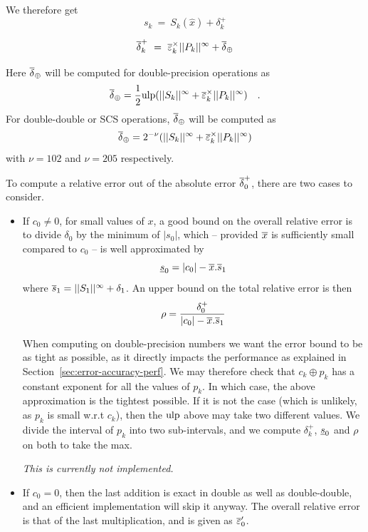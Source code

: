 \begin{itemize}
\begin{itemize}
    We therefore get 
      \begin{equation}
        s_{k} \ = \  S_{k}(\hat{x}) + \delta^+_k \label{eq:sk}
      \end{equation}
      
      \begin{equation}
        {\overline{\delta}}^+_k  \ = \  {\overline{\varepsilon}}^\times_k||{P_{k}}||^{\infty} + {\overline{\delta}}_\oplus\label{eq:maxdelta}
      \end{equation}
      
      Here ${\overline{\delta}}_\oplus$ will be computed for double-precision operations as 
      $${\overline{\delta}}_\oplus = \frac{1}{2}\mbox{ulp}(||{S_{k}}||^{\infty} + {\overline{\varepsilon}}^\times_k||{P_{k}}||^{\infty})\quad .$$
      For double-double or SCS operations, ${\overline{\delta}}_\oplus$ will be computed as
      $${\overline{\delta}}_\oplus=2^{-\nu}(||{S_{k}}||^{\infty} + {\overline{\varepsilon}}^\times_k||{P_{k}}||^{\infty})$$
      with $\nu=102$ and $\nu=205$ respectively.
    \end{itemize}
  \end{itemize}
  

  To compute a  relative error out of the absolute error
  ${\overline{\delta}}^+_0$, there are two cases to consider.
\begin{itemize}
\item If $c_0\ne 0$, for small values of $x$, a good bound on the
  overall relative error is to divide $\delta_0$ by the minimum of
  $|s_0|$, which -- provided ${\overline{x}}$ is sufficiently small compared to
  $c_0$ -- is well approximated by
  $$\underline{s}_{0}=|c_0| - {\overline{x}} . \overline{s}_{1}$$ 
  where $\overline{s}_{1}=||{S_1}||^{\infty} + \delta_1$.
  An upper bound on the total
  relative error is then
  $$\rho = \frac{\delta^+_0}{|c_0| - {\overline{x}} . \overline{s}_{1}}$$
  
  When computing on double-precision numbers we want the error bound
  to be as tight as possible, as it directly impacts the performance
  as explained in Section~\ref{sec:error-accuracy-perf}. We may
  therefore check that $c_k \oplus p_k$ has a constant exponent for
  all the values of $p_k$. In which case, the above approximation is
  the tightest possible. If it is not the case (which is unlikely, as
  $p_k$ is small w.r.t $c_k$), then the $\mbox{ulp}$ above may take two
  different values. We divide the interval of $p_k$ into two
  sub-intervals, and we compute $\delta^+_k$, $\underline{s}_{0}$ and $\rho$ on
  both to take the max.
  
\emph{This is currently not implemented.}

\item If $c_0=0$, then the last addition is exact in double as well as
  double-double, and an efficient implementation will skip it anyway.
  The overall relative error is that of the last multiplication, and is given as ${\overline{\varepsilon}}'_0$.
\end{itemize}



